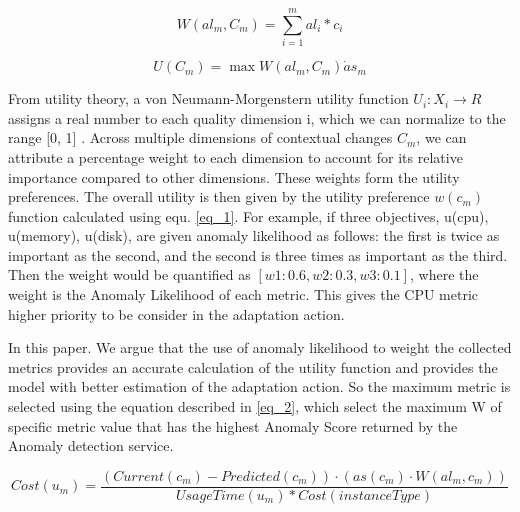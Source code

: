 \documentclass[graybox]{svmult}
\begin{document}
 
\begin{equation}
\label{eq_1}
W(al_{m},C_{m}) =  \sum_{i=1}^{m} al_{i} * c_{i}
\end{equation}

 \begin{equation}
\label{eq_2}
U(C_{m}) =  \max  W(al_{m},C_{m}) \dot as_{m}
\end{equation}

 
 
 
From utility theory, a von Neumann-Morgenstern utility function $U_{i} : X_{i} \rightarrow {R}$ assigns a real number to each quality dimension i, which we can normalize to the range [0, 1] \cite{fishburn1979two}. Across multiple dimensions of contextual changes $C_{m}$, we can attribute a percentage weight to each dimension to account for its relative importance compared to other dimensions. These weights form the utility preferences. The overall utility is then given by the utility preference $w(c_{m})$ function calculated using equ. \ref{eq_1}. For example, if three objectives, u(cpu), u(memory), u(disk), are given anomaly likelihood as follows: the first is twice as important as the second, and the second is three times as important as the third. Then the weight would be quantified as $[w1 : 0.6, w2 : 0.3, w3 : 0.1]$, where the weight is the Anomaly Likelihood of each metric. This gives the CPU metric higher priority to be consider in the adaptation action.
 

In this paper. We argue that the use of anomaly likelihood to weight the collected metrics provides an accurate calculation of the utility function and provides the model with better estimation of the adaptation action. So the maximum metric is selected using the equation described in \ref{eq_2}, which select the maximum W of specific metric value that has the highest Anomaly Score returned by the Anomaly detection service. 

\begin{equation}
\label{eq_3}
Cost(u_{m}) = \frac{(Current(c_{m}) - Predicted(c_{m}))\cdot (as(c_{m}) \cdot W(al_{m}, c_{m}))}{UsageTime(u_{m}) * Cost(instanceType)}
\end{equation}
\end{document}
